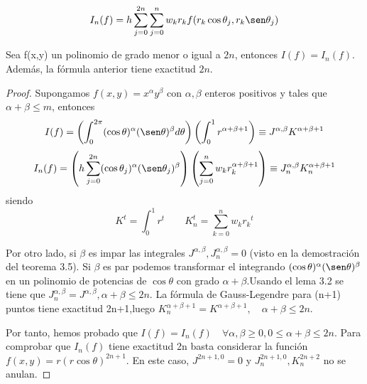 $$ I_n(f) = h\sum_{j=0}^{2n}\sum_{j=0}^{n} w_k r_k f(r_k \cos\theta_j,r_k\sen\theta_j)$$
\begin{thm}Sea f(x,y) un polinomio de grado menor o igual a $2n$, entonces $I(f)=I_n(f)$. Además, la fórmula anterior tiene exactitud $2n$. 
\end{thm}
\begin{proof}
	Supongamos $f(x,y)=x^\alpha y^\beta$ con  $\alpha,\beta$ enteros positivos y tales que  $\alpha+\beta \le m$, entonces
	$$
	I(f)=\left(\int_{0}^{2\pi}(\cos\theta)^{\alpha}(\sen\theta)^{\beta}d\theta\right)\left(\int_{0}^{1}r^{\alpha+\beta +1}\right) \equiv J^{\alpha,\beta}K^{ \alpha+\beta+1 }
	$$
	$$
	I_n(f) = \left(h\sum_{j=0}^{2n}(\cos\theta_j)^{\alpha}(\sen\theta_j)^{\beta}\right) \left(\sum_{j=0}^{n}w_kr_k^{\alpha+\beta+1}\right)\equiv J_n^{\alpha,\beta}K_n^{ \alpha+\beta+1 }
	$$
	siendo
	$$
	K^t = \int_{0}^{1 } r^t \qquad K_n^t=\sum_{k=0}^{n} w_k{r_k}^t
	$$
	
	Por otro lado, si $\beta$ es impar las integrales $J^{\alpha,\beta},J_n^{\alpha,\beta}=0$ (visto en la demostración del teorema 3.5). Si $\beta$ es par podemos transformar el integrando $(\cos \theta)^\alpha(\sen\theta)^\beta$ en un polinomio de potencias de $\cos \theta$ con grado $\alpha+\beta$.Usando el lema 3.2 se tiene que $J_n^{\alpha,\beta} = J^{\alpha,\beta}, \alpha+\beta\le 2n$. 
	\medskip
	La fórmula de Gauss-Legendre para (n+1) puntos tiene exactitud 2n+1,luego $K_n^{ \alpha+\beta+1 }=K^{ \alpha+\beta+1 }, \quad \alpha+\beta \le 2n$.
	\medskip
	
	Por tanto, hemos probado que $I(f) = I_n(f) \quad \forall \alpha,\beta\ge 0, 0\le\alpha+\beta \le 2n $.
	Para comprobar que $I_n(f)$ tiene exactitud 2n basta considerar la función $f(x,y) = r(r\cos\theta)^{2n+1}$. En este caso, $J^{2n+1,0}=0$ y $J_n^{2n+1,0},K_n^{2n+2}$ no se anulan.
\end{proof}